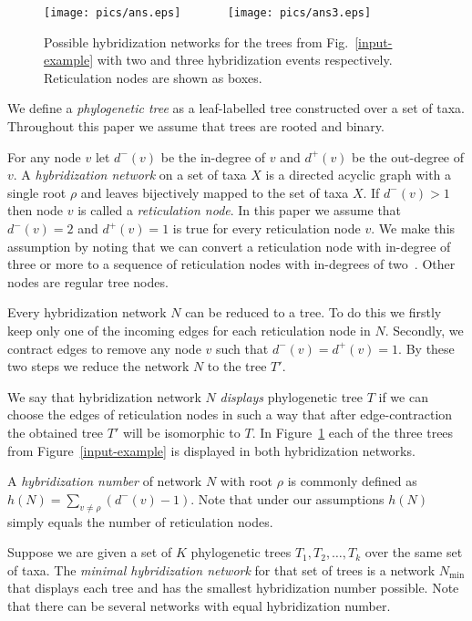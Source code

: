 \documentclass[runningheads, envcountsame, a4paper]{llncs}
\begin{document}
\begin{figure}[t]
  \centering
  \texttt{[image: pics/ans.eps]}
  ~~~~~~
  \texttt{[image: pics/ans3.eps]}
  \caption{Possible hybridization networks for the trees from Fig.~\ref{input-example} with two and three hybridization events respectively. Reticulation nodes are shown as boxes.}
  \label{network-example}
\end{figure}

We define a \emph{phylogenetic tree} as a leaf-labelled tree constructed over a set of taxa. 
Throughout this paper we assume that trees are rooted and binary.

For any node $v$ let $d^-(v)$ be the in-degree of $v$ and $d^+(v)$ be the out-degree of $v$.
A \emph{hybridization network} on a set of taxa $X$ is a directed acyclic graph 
with a single root $\rho$ and leaves bijectively mapped to the set of taxa $X$. If $d^-(v) > 1$ then 
node $v$ is called a \emph{reticulation node}. In this paper we assume that $d^-(v) = 2$ and $d^+(v) = 1$ is true for every reticulation node $v$.
We make this assumption by noting that we can convert a reticulation node with in-degree 
of three or more to a sequence of reticulation nodes with in-degrees of two~\cite{wu2010close}. Other nodes are regular 
tree nodes.

Every hybridization network $N$ can be reduced to a tree. To do this we firstly keep only one of the incoming edges for each reticulation node in $N$. 
Secondly, we contract edges to remove any node $v$ such that $d^-(v) = d^+(v) = 1$. By these two steps we reduce the network $N$ 
to the tree $T'$.

We say that hybridization network $N$ \emph{displays} phylogenetic tree $T$ 
if we can choose the edges of reticulation nodes in such a way that after edge-contraction the obtained tree $T'$ will be 
isomorphic to $T$. In Figure~\ref{network-example} each of the three trees from Figure~\ref{input-example} is displayed in both hybridization networks.

A \emph{hybridization number} of network $N$ with root $\rho$ is commonly defined as $h(N) = \sum\limits_{v \ne \rho} (d^-(v) - 1)$.
Note that under our assumptions $h(N)$ simply equals the number of reticulation nodes.

Suppose we are given a set of $K$ phylogenetic trees $T_1, T_2, \dots, T_k$ over the same set of taxa. The \emph{minimal 
hybridization network} for that set of trees is a network $N\mathrm{_{min}}$ that displays each tree and has the smallest 
hybridization number possible. Note that there can be several networks with equal hybridization number.
\end{document}
